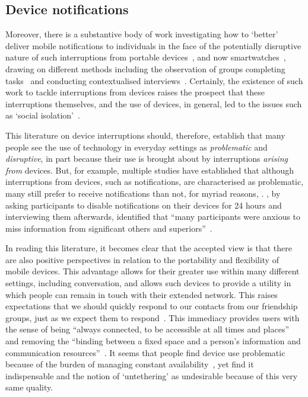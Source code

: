 \subsection{Device notifications}\label{sec:background litreview society notifications}
Moreover, there is a substantive body of work investigating how to `better' deliver mobile notifications to individuals in the face of the potentially disruptive nature of such interruptions from portable devices~\citep{Cutrell2000,Fischer2010a,Lopez-Tovar2015}, and now smartwatches~\citep{Cecchinato2017}, drawing on different methods including the observation of groups completing tasks~\citep{Fischer2013} and conducting contextualised interviews~\citep{Hudson2002}.
Certainly, the existence of such work to tackle interruptions from devices raises the prospect that these interruptions themselves, and the use of devices, in general, led to the issues such as `social isolation'~\citep{Turkle2011}.

This literature on device interruptions should, therefore, establish that many people see the use of technology in everyday settings as \textit{problematic} and \textit{disruptive}, in part because their use is brought about by interruptions \textit{arising from} devices.
But, for example, multiple studies have established that although interruptions from devices, such as notifications,  are characterised as problematic, many still prefer to receive notifications than not, for myriad reasons, .
\citet{Pielot2015a}, by asking participants to disable notifications on their devices for 24 hours and interviewing them afterwards, identified that ``many participants were anxious to miss information from significant others and superiors''~\citep[p. 1765]{Pielot2015a}.

In reading this literature, it becomes clear that the accepted view is that there are also positive perspectives in relation to the portability and flexibility of mobile devices.
This advantage allows for their greater use within many different settings, including conversation, and allows such devices to provide a utility in which people can remain in touch with their extended network.
This raises expectations that we should quickly respond to our contacts from our friendship groups, just as we expect them to respond~\citep{Ames2013}.
This immediacy provides users with the sense of being ``always connected, to be accessible at all times and places''~\citep[p. 240]{Peters2005} and removing the ``binding between a fixed space and a person’s information and communication resources''~\citep[p. 324]{Perry2001}.
It seems that people find device use problematic because of the burden of managing constant availability~\citep{Sadler2007}, yet find it indispensable and the notion of `untethering' as undesirable because of this very same quality.

